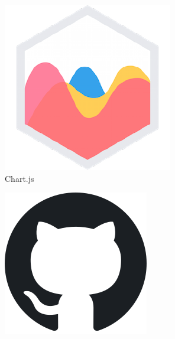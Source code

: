 \documentclass{prrcs}
\begin{document}
\begin{figure}[h]
\begin{subfigure}[b]{0.075\textwidth}
    \end{subfigure}
    \hfill
    \begin{subfigure}[b]{0.08\textwidth}
        \centering
        \includegraphics[width=\textwidth]{chartjs_logo.png}
        \caption*{{\footnotesize Chart.js}}
    \end{subfigure}
    \hfill
    \begin{subfigure}[b]{0.08\textwidth}  
        \centering 
        \includegraphics[width=\textwidth]{github_logo.png}

\end{subfigure}
\end{figure}
\end{document}
